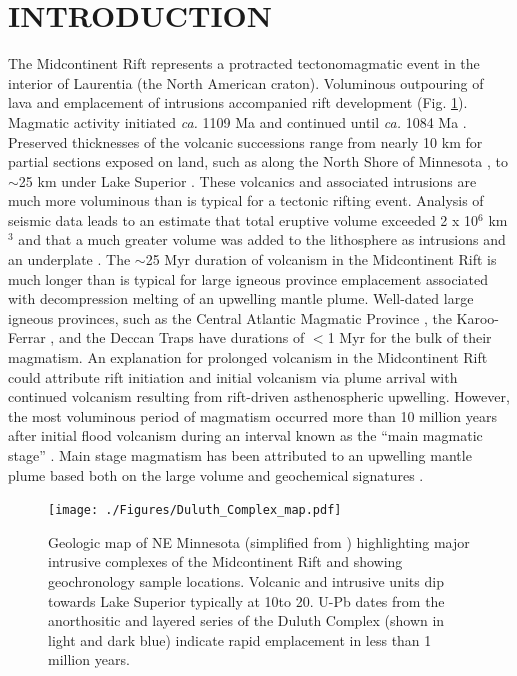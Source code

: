 \documentclass[11pt,letterpaper]{article}
\begin{document}
\section*{INTRODUCTION}

The Midcontinent Rift represents a protracted tectonomagmatic event in the interior of Laurentia (the North American craton). Voluminous outpouring of lava and emplacement of intrusions accompanied rift development (Fig. \ref{fig:map}). Magmatic activity initiated \textit{ca.} 1109 Ma and continued until \textit{ca.} 1084 Ma \citep{Swanson-Hysell2019a}. Preserved thicknesses of the volcanic successions range from nearly 10 km for partial sections exposed on land, such as along the North Shore of Minnesota \citep{Green2011a}, to $\sim$25 km under Lake Superior \citep{Cannon1992b}. These volcanics and associated intrusions are much more voluminous than is typical for a tectonic rifting event. Analysis of seismic data leads to an estimate that total eruptive volume exceeded 2 x 10$^6$ km$^3$ and that a much greater volume was added to the lithosphere as intrusions and an underplate \citep{Cannon1992b}. The $\sim$25 Myr duration of volcanism in the Midcontinent Rift is much longer than is typical for large igneous province emplacement associated with decompression melting of an upwelling mantle plume. Well-dated large igneous provinces, such as the Central Atlantic Magmatic Province \citep{Blackburn2013a}, the Karoo-Ferrar \citep{Burgess2015a}, and the Deccan Traps \citep{Schoene2019a, Sprain2019a} have durations of $<$1 Myr for the bulk of their magmatism. An explanation for prolonged volcanism in the Midcontinent Rift could attribute rift initiation and initial volcanism via plume arrival with continued volcanism resulting from rift-driven asthenospheric upwelling. However, the most voluminous period of magmatism occurred more than 10 million years after initial flood volcanism during an interval known as the ``main magmatic stage'' \citep{Vervoort2007a}. Main stage magmatism has been attributed to an upwelling mantle plume based both on the large volume and geochemical signatures \citep{Nicholson1990a, White1995a}.

\begin{figure}[!ht]
\noindent\texttt{[image: ./Figures/Duluth\_Complex\_map.pdf]}
\centering
\caption{\small{Geologic map of NE Minnesota (simplified from \citealp{Jirsa2011a}) highlighting major intrusive complexes of the Midcontinent Rift and showing geochronology sample locations. Volcanic and intrusive units dip towards Lake Superior typically at 10\textdegree to 20\textdegree. U-Pb dates from the anorthositic and layered series of the Duluth Complex (shown in light and dark blue) indicate rapid emplacement in less than 1 million years.}}
\label{fig:map}
\end{figure}
\end{document}
